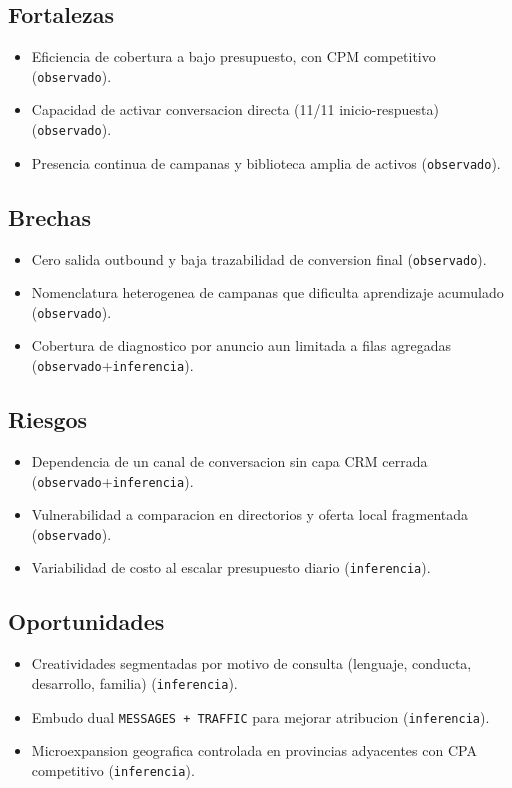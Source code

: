 \documentclass[9pt,a4paper,twocolumn,twoside]{tau-class/tau}
\begin{document}
\subsection{Fortalezas}
\begin{itemize}
  \item Eficiencia de cobertura a bajo presupuesto, con CPM competitivo (\texttt{observado}).
  \item Capacidad de activar conversacion directa (11/11 inicio-respuesta) (\texttt{observado}).
  \item Presencia continua de campanas y biblioteca amplia de activos (\texttt{observado}).
\end{itemize}

\subsection{Brechas}
\begin{itemize}
  \item Cero salida outbound y baja trazabilidad de conversion final (\texttt{observado}).
  \item Nomenclatura heterogenea de campanas que dificulta aprendizaje acumulado (\texttt{observado}).
  \item Cobertura de diagnostico por anuncio aun limitada a filas agregadas (\texttt{observado}+\texttt{inferencia}).
\end{itemize}

\subsection{Riesgos}
\begin{itemize}
  \item Dependencia de un canal de conversacion sin capa CRM cerrada (\texttt{observado}+\texttt{inferencia}).
  \item Vulnerabilidad a comparacion en directorios y oferta local fragmentada (\texttt{observado}).
  \item Variabilidad de costo al escalar presupuesto diario (\texttt{inferencia}).
\end{itemize}

\subsection{Oportunidades}
\begin{itemize}
  \item Creatividades segmentadas por motivo de consulta (lenguaje, conducta, desarrollo, familia) (\texttt{inferencia}).
  \item Embudo dual \texttt{MESSAGES + TRAFFIC} para mejorar atribucion (\texttt{inferencia}).
  \item Microexpansion geografica controlada en provincias adyacentes con CPA competitivo (\texttt{inferencia}).
\end{itemize}
\end{document}
